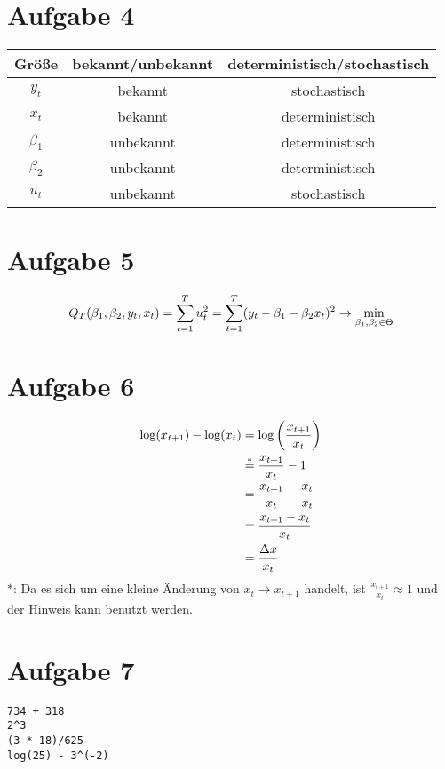 \documentclass{article}
\begin{document}
	\section*{Aufgabe 4}
	\begin{center}
		\begin{tabular}{c|cc}
			\textbf{Größe} & \textbf{bekannt/unbekannt} & \textbf{deterministisch/stochastisch} \\
			\hline
			$y_t$ & bekannt & stochastisch \\
			$x_t$ & bekannt & deterministisch \\
			$\beta_1$ & unbekannt & deterministisch \\
			$\beta_2$ & unbekannt & deterministisch \\
			$u_t$ & unbekannt & stochastisch
		\end{tabular}
	\end{center}
	
	\section*{Aufgabe 5}
	\begin{align}
		Q_T(\beta_1,\beta_2,y_t,x_t) = \sum_{t=1}^{T} u_t^2 = \sum_{t=1}^T (y_t-\beta_1 - \beta_2x_t)^2\to \min_{\beta_1,\beta_2\in\Theta} \notag
	\end{align}
	
	\section*{Aufgabe 6}
	\begin{align}
		\log(x_{t+1}) - \log(x_t) &= \log\left(\frac{x_{t+1}}{x_t}\right) \notag \\
		&\overset{\ast}{=} \frac{x_{t+1}}{x_t} - 1 \notag \\
		&= \frac{x_{t+1}}{x_t} - \frac{x_t}{x_t} \notag \\
		&= \frac{x_{t+1}-x_t}{x_t} \notag \\
		&= \frac{\Delta x}{x_t} \notag
	\end{align}
	$\ast$: Da es sich um eine kleine Änderung von $x_t\to x_{t+1}$ handelt, ist $ \frac{x_{t+1}}{x_t}\approx 1$ und der Hinweis kann benutzt werden.
	
	\section*{Aufgabe 7}
	\begin{lstlisting}[style=R]
734 + 318
2^3
(3 * 18)/625
log(25) - 3^(-2)
	\end{lstlisting}
	
\end{document}
